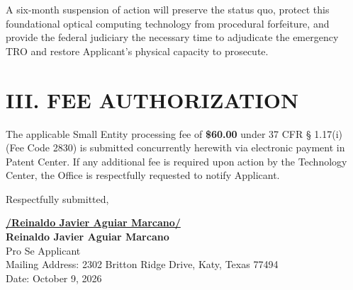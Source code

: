 \documentclass[11pt,letterpaper]{article}
\begin{document}
A six-month suspension of action will preserve the status quo, protect this foundational optical computing technology from procedural forfeiture, and provide the federal judiciary the necessary time to adjudicate the emergency TRO and restore Applicant's physical capacity to prosecute.

\section*{III. FEE AUTHORIZATION}

The applicable Small Entity processing fee of \textbf{\$60.00} under 37 CFR \S{} 1.17(i) (Fee Code 2830) is submitted concurrently herewith via electronic payment in Patent Center. If any additional fee is required upon action by the Technology Center, the Office is respectfully requested to notify Applicant.

\vspace{0.3cm}
\begin{singlespace}
\noindent Respectfully submitted, \par\vspace{0.8cm}
\underline{\textbf{/Reinaldo Javier Aguiar Marcano/}} \\
\textbf{Reinaldo Javier Aguiar Marcano} \\
Pro Se Applicant \\
Mailing Address: 2302 Britton Ridge Drive, Katy, Texas 77494 \\
Date: October 9, 2026
\end{singlespace}
\end{document}
